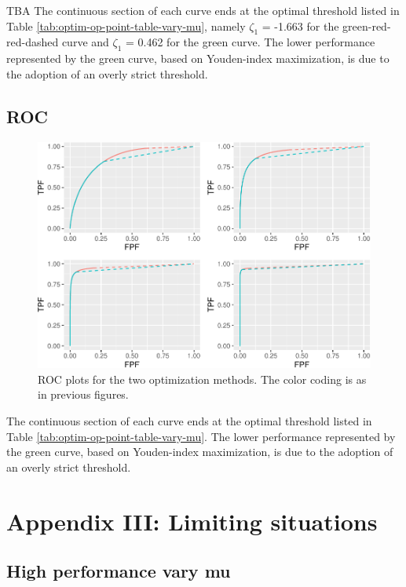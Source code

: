 \documentclass[
]{book}
\begin{document}
TBA The continuous section of each curve ends at the optimal threshold listed in Table \ref{tab:optim-op-point-table-vary-mu}, namely \(\zeta_1\) = -1.663 for the green-red-red-dashed curve and \(\zeta_1\) = 0.462 for the green curve. The lower performance represented by the green curve, based on Youden-index maximization, is due to the adoption of an overly strict threshold.

\hypertarget{roc-4}{%
\subsection{ROC}\label{roc-4}}

\begin{figure}
\centering
\includegraphics{22-optim-op-point_files/figure-latex/optim-op-point-vary-mu-roc-1.pdf}
\caption{\label{fig:optim-op-point-vary-mu-roc}ROC plots for the two optimization methods. The color coding is as in previous figures.}
\end{figure}

The continuous section of each curve ends at the optimal threshold listed in Table \ref{tab:optim-op-point-table-vary-mu}. The lower performance represented by the green curve, based on Youden-index maximization, is due to the adoption of an overly strict threshold.

\hypertarget{optim-op-point-limiting-situations}{%
\section{Appendix III: Limiting situations}\label{optim-op-point-limiting-situations}}

\hypertarget{optim-op-point-high-performance-vary-mu}{%
\subsection{High performance vary mu}\label{optim-op-point-high-performance-vary-mu}}
\end{document}
